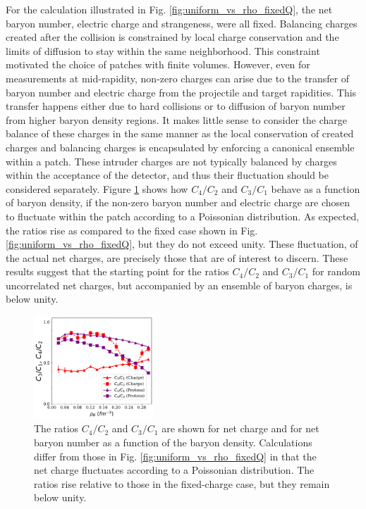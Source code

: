 For the calculation illustrated in Fig. \ref{fig:uniform_vs_rho_fixedQ}, the net baryon number, electric charge and strangeness, were all fixed. Balancing charges created after the collision is constrained by local charge conservation and the limits of diffusion to stay within the same neighborhood. This constraint motivated the choice of patches with finite volumes. However, even for measurements at mid-rapidity, non-zero charges can arise due to the transfer of baryon number and electric charge from the projectile and target rapidities. This transfer happens either due to hard collisions or to diffusion of baryon number from higher baryon density regions. It makes little sense to consider the charge balance of these charges in the same manner as the local conservation of created charges and balancing charges is encapsulated by enforcing a canonical ensemble within a patch. These intruder charges are not typically balanced by charges within the acceptance of the detector, and thus their fluctuation should be considered separately. Figure \ref{fig:uniform_vs_rho_fluctuatingQ} shows how $C_4/C_2$ and $C_3/C_1$ behave as a function of baryon density, if the non-zero baryon number and electric charge are chosen to fluctuate within the patch according to a Poissonian distribution. As expected, the ratios rise as compared to the fixed case shown in Fig. \ref{fig:uniform_vs_rho_fixedQ}, but they do not exceed unity. These fluctuation, of the actual net charges, are precisely those that are of interest to discern. These results suggest that the starting point for the ratios $C_4/C_2$ and $C_3/C_1$ for random uncorrelated net charges, but accompanied by an ensemble of baryon charges, is below unity.
\begin{figure}
\centerline{\includegraphics[width=0.4\textwidth]{figs/m_vs_rho_fluctuatingQ}}
\caption{\label{fig:uniform_vs_rho_fluctuatingQ}
The ratios $C_4/C_2$ and $C_3/C_1$ are shown for net charge and for net baryon number as a function of the baryon density. Calculations differ from those in Fig. \ref{fig:uniform_vs_rho_fixedQ} in that the net charge fluctuates according to a Poissonian distribution. The ratios rise relative to those in the fixed-charge case, but they remain below unity.}
\end{figure}


%
